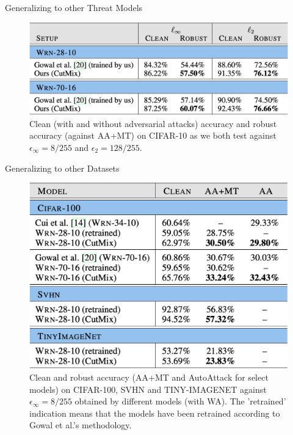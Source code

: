 \begin{frame}{Generalizing to other Threat Models}
    \begin{figure}
        \centering
            \includegraphics[width=\linewidth]{pic/Gen_Threat.png}
            \caption{Clean (with and without adversarial attacks) accuracy and robust accuracy (against AA+MT) on CIFAR-10 as we both test against $\epsilon_\infty = 8/255$ and $\epsilon_2 = 128/255$.}\label{fig:gen_threat}
    \end{figure}
\end{frame}

\begin{frame}{Generalizing to other Datasets}
    \begin{figure}
        \centering
        \includegraphics[width=0.7\linewidth]{pic/Gen_Data.png}
        \caption{Clean and robust accuracy (AA+MT and AutoAttack for select models) on CIFAR-100, SVHN and TINY-IMAGENET against $\epsilon_\infty = 8/255$ obtained by different models (with WA). The ’retrained’ indication means that the models have been retrained according to Gowal et al.’s methodology.}
        \label{fig:gen_data}
    \end{figure}
\end{frame}

